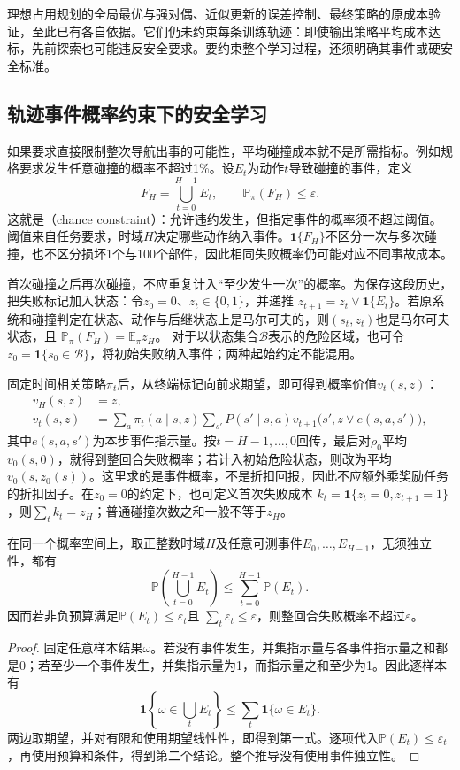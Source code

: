 理想占用规划的全局最优与强对偶、近似更新的误差控制、最终策略的原成本验证，至此已有各自依据。它们仍未约束每条训练轨迹：即使输出策略平均成本达标，先前探索也可能违反安全要求。要约束整个学习过程，还须明确其事件或硬安全标准。

\subsection{轨迹事件概率约束下的安全学习}
\label{sec:rl-trustworthy-chance}

如果要求直接限制整次导航出事的可能性，平均碰撞成本就不是所需指标。例如规格要求发生任意碰撞的概率不超过1\%。设$E_t$为动作$t$导致碰撞的事件，定义
\[
  F_H=\bigcup_{t=0}^{H-1}E_t,\qquad
  \mathbb P_\pi(F_H)\leq\varepsilon.
\]
这就是（chance constraint）：允许违约发生，但指定事件的概率须不超过阈值。阈值来自任务要求，时域$H$决定哪些动作纳入事件。$\mathbf1\{F_H\}$不区分一次与多次碰撞，也不区分损坏1个与100个部件，因此相同失败概率仍可能对应不同事故成本。

首次碰撞之后再次碰撞，不应重复计入“至少发生一次”的概率。为保存这段历史，把失败标记加入状态：令$z_0=0$、$z_t\in\{0,1\}$，并递推
$z_{t+1}=z_t\lor\mathbf1\{E_t\}$。若原系统和碰撞判定在状态、动作与后继状态上是马尔可夫的，则$(s_t,z_t)$也是马尔可夫状态，且
$\mathbb P_\pi(F_H)=\mathbb E_\pi z_H$。
对于以状态集合$\mathcal B$表示的危险区域，也可令$z_0=\mathbf1\{s_0\in\mathcal B\}$，将初始失败纳入事件；两种起始约定不能混用。

固定时间相关策略$\pi_t$后，从终端标记向前求期望，即可得到概率价值$v_t(s,z)$：
\begin{align}
  v_H(s,z)&=z,\nonumber\\
  v_t(s,z)&=\sum_a\pi_t(a\mid s,z)
       \sum_{s'}P(s'\mid s,a)
         v_{t+1}\bigl(s',z\lor e(s,a,s')\bigr),
  \label{eq:rl-trustworthy-probability-value}
\end{align}
其中$e(s,a,s')$为本步事件指示量。按$t=H-1,\ldots,0$回传，最后对$\rho_0$平均$v_0(s,0)$，就得到整回合失败概率；若计入初始危险状态，则改为平均$v_0(s,z_0(s))$。这里求的是事件概率，不是折扣回报，因此不应额外乘奖励任务的折扣因子。在$z_0=0$的约定下，也可定义首次失败成本
$k_t=\mathbf1\{z_t=0,z_{t+1}=1\}$，则$\sum_tk_t=z_H$；普通碰撞次数之和一般不等于$z_H$。

\begin{theorem}[风险预算的并集界]
  \label{thm:rl-trustworthy-union-bound}
  在同一个概率空间上，取正整数时域$H$及任意可测事件$E_0,\ldots,E_{H-1}$，无须独立性，都有
  \[
    \mathbb P\left(\bigcup_{t=0}^{H-1}E_t\right)
      \leq\sum_{t=0}^{H-1}\mathbb P(E_t).
  \]
  因而若非负预算满足$\mathbb P(E_t)\leq\varepsilon_t$且
  $\sum_t\varepsilon_t\leq\varepsilon$，则整回合失败概率不超过$\varepsilon$。
\end{theorem}
\begin{proof}
  固定任意样本结果$\omega$。若没有事件发生，并集指示量与各事件指示量之和都是0；若至少一个事件发生，并集指示量为1，而指示量之和至少为1。因此逐样本有
  \[
    \mathbf1\left\{\omega\in\bigcup_tE_t\right\}
      \leq\sum_t\mathbf1\{\omega\in E_t\}.
  \]
  两边取期望，并对有限和使用期望线性性，即得到第一式。逐项代入$\mathbb P(E_t)\leq\varepsilon_t$，再使用预算和条件，得到第二个结论。整个推导没有使用事件独立性。
\end{proof}

